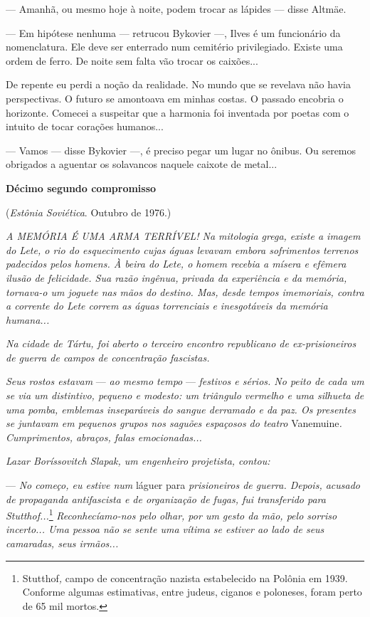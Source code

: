 --- Amanhã, ou mesmo hoje à noite, podem trocar as lápides --- disse
Altmäe.

--- Em hipótese nenhuma --- retrucou Bykovier ---, Ilves é um
funcionário da nomenclatura. Ele deve ser enterrado num cemitério
privilegiado. Existe uma ordem de ferro. De noite sem falta vão trocar
os caixões...

De repente eu perdi a noção da realidade. No mundo que se revelava não
havia perspectivas. O futuro se amontoava em minhas costas. O passado
encobria o horizonte. Comecei a suspeitar que a harmonia foi inventada
por poetas com o intuito de tocar corações humanos...

--- Vamos --- disse Bykovier ---, é preciso pegar um lugar no ônibus. Ou
seremos obrigados a aguentar os solavancos naquele caixote de metal...

\textbf{Décimo segundo compromisso}

(\emph{Estônia Soviética}. Outubro de 1976.)

\emph{A MEMÓRIA É UMA ARMA TERRÍVEL! Na mitologia grega, existe a imagem
do Lete, o rio do esquecimento cujas águas levavam embora sofrimentos
terrenos padecidos pelos homens. À beira do Lete, o homem recebia a
mísera e efêmera ilusão de felicidade. Sua razão ingênua, privada da
experiência e da memória, tornava-o um joguete nas mãos do destino. Mas,
desde tempos imemoriais, contra a corrente do Lete correm as águas
torrenciais e inesgotáveis da memória humana...}

\emph{Na cidade de Tártu, foi aberto o terceiro encontro republicano de
ex-prisioneiros de guerra de campos de concentração fascistas.}

\emph{Seus rostos estavam} --- \emph{ao mesmo tempo} --- \emph{festivos
e sérios. No peito de cada um se via um distintivo, pequeno e modesto:
um triângulo vermelho e uma silhueta de uma pomba, emblemas inseparáveis
do sangue derramado e da paz. Os presentes se juntavam em pequenos
grupos nos saguões espaçosos do teatro} Vanemuine\emph{. Cumprimentos,
abraços, falas emocionadas...}

\emph{Lazar Boríssovitch Slapak, um engenheiro projetista, contou:}

--- \emph{No começo, eu estive num} láguer para \emph{prisioneiros de
guerra. Depois, acusado de propaganda antifascista e de organização de
fugas, fui transferido para Stutthof...}\footnote{Stutthof\emph{,} campo
  de concentração nazista estabelecido na Polônia em 1939. Conforme
  algumas estimativas, entre judeus, ciganos e poloneses, foram perto de
  65 mil mortos.} \emph{Reconhecíamo-nos pelo olhar, por um gesto da
mão, pelo sorriso incerto... Uma pessoa não se sente uma vítima se
estiver ao lado de seus camaradas, seus irmãos...}

